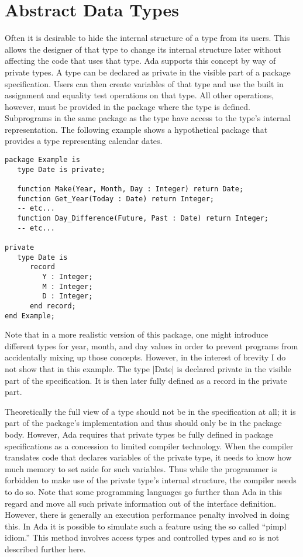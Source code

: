 \section{Abstract Data Types}

Often it is desirable to hide the internal structure of a type from its users. This allows the
designer of that type to change its internal structure later without affecting the code that
uses that type. Ada supports this concept by way of private types. A type can be declared as
private in the visible part of a package specification. Users can then create variables of that
type and use the built in assignment and equality test operations on that type. All other
operations, however, must be provided in the package where the type is defined. Subprograms in
the same package as the type have access to the type's internal representation. The following
example shows a hypothetical package that provides a type representing calendar dates.

\begin{lstlisting}
package Example is
   type Date is private;

   function Make(Year, Month, Day : Integer) return Date;
   function Get_Year(Today : Date) return Integer;
   -- etc...
   function Day_Difference(Future, Past : Date) return Integer;
   -- etc...

private
   type Date is
      record
         Y : Integer;
         M : Integer;
         D : Integer;
      end record;
end Example;
\end{lstlisting}

Note that in a more realistic version of this package, one might introduce different types for
year, month, and day values in order to prevent programs from accidentally mixing up those
concepts. However, in the interest of brevity I do not show that in this example. The type
|Date| is declared private in the visible part of the specification. It is then later fully
defined as a record in the private part.

Theoretically the full view of a type should not be in the specification at all; it is part of
the package's implementation and thus should only be in the package body. However, Ada requires
that private types be fully defined in package specifications as a concession to limited
compiler technology. When the compiler translates code that declares variables of the private
type, it needs to know how much memory to set aside for such variables. Thus while the
programmer is forbidden to make use of the private type's internal structure, the compiler needs
to do so. Note that some programming languages go further than Ada in this regard and move all
such private information out of the interface definition. However, there is generally an
execution performance penalty involved in doing this. In Ada it is possible to simulate such a
feature using the so called ``pimpl idiom.'' This method involves access types and controlled
types and so is not described further here.


